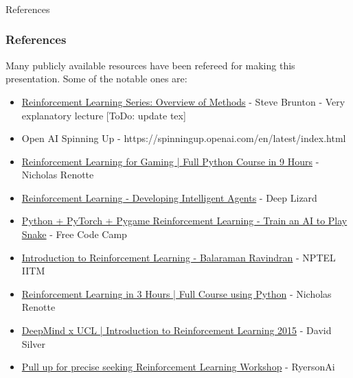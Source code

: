 \begin{frame}[fragile]\frametitle{}
\begin{center}
{\Large References}
\end{center}
\end{frame}

\begin{frame}\frametitle{References}
Many publicly available resources have been refereed for making this presentation. Some of the notable ones are:
\footnotesize
\begin{itemize}
\item \href{https://www.youtube.com/watch?v=i7q8bISGwMQ}{Reinforcement Learning Series: Overview of Methods} - Steve Brunton - Very explanatory lecture [ToDo: update tex]
\item Open AI Spinning Up - https://spinningup.openai.com/en/latest/index.html
\item \href{https://www.youtube.com/watch?v=dWmJ5CXSKdw}{Reinforcement Learning for Gaming | Full Python Course in 9 Hours} - Nicholas Renotte
\item \href{https://www.youtube.com/playlist?list=PLZbbT5o_s2xoWNVdDudn51XM8lOuZ_Njv}{Reinforcement Learning - Developing Intelligent Agents} - Deep Lizard
\item \href{https://www.youtube.com/watch?v=L8ypSXwyBds}{Python + PyTorch + Pygame Reinforcement Learning - Train an AI to Play Snake} - Free Code Camp
\item \href{https://www.youtube.com/playlist?list=PLEAYkSg4uSQ0Hkv_1LHlJtC_wqwVu6RQX}{Introduction to Reinforcement Learning - Balaraman Ravindran} - NPTEL IITM
\item \href{https://www.youtube.com/watch?v=Mut_u40Sqz4}{Reinforcement Learning in 3 Hours | Full Course using Python} - Nicholas Renotte
\item \href{https://www.youtube.com/playlist?list=PLqYmG7hTraZDM-OYHWgPebj2MfCFzFObQ}{DeepMind x UCL | Introduction to Reinforcement Learning 2015} - David Silver
\item \href{https://www.youtube.com/watch?v=8GywDvor9mI}{Pull up for precise seeking Reinforcement Learning Workshop} - RyersonAi


\end{itemize}
\end{frame}
